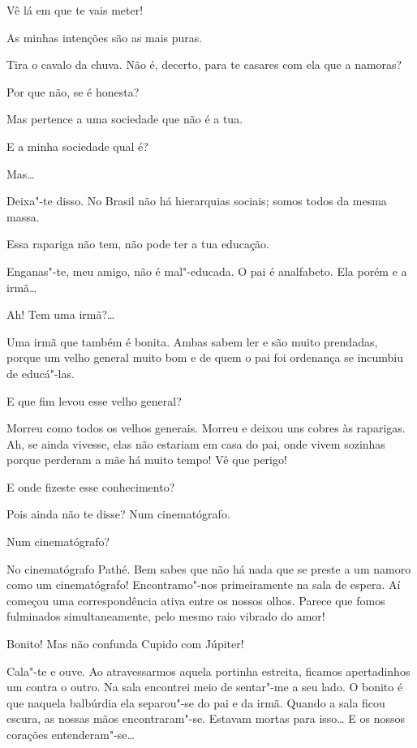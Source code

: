  Vê lá em que te vais meter!

 As minhas intenções são as mais puras.

 Tira o cavalo da chuva. Não é,
decerto, para te casares com ela que a namoras?

 Por que não, se é honesta?

 Mas pertence a uma sociedade que não é a tua.

 E a minha sociedade qual é?

 Mas\ldots

 Deixa"-te
disso. No Brasil não há hierarquias sociais; somos
todos da mesma massa.

 Essa rapariga não tem,
não pode ter a tua educação.

 Enganas"-te, meu
amigo, não é mal"-educada. O pai é analfabeto. Ela
porém e a irmã\ldots

 Ah! Tem uma irmã?\ldots

 Uma irmã
que também é bonita. Ambas sabem ler e são muito
prendadas, porque um velho general muito bom e de quem o pai
foi ordenança se incumbiu de educá"-las.

 E que fim levou
esse velho general?

 Morreu como todos
os velhos generais. Morreu e deixou uns cobres às
raparigas. Ah, se ainda vivesse, elas não estariam
em casa do pai, onde vivem sozinhas porque perderam a
mãe há muito tempo! Vê que perigo!

 E onde fizeste esse
conhecimento?

 Pois ainda
não te disse? Num cinematógrafo.

 Num cinematógrafo?

 No
cinematógrafo Pathé. Bem sabes que não há
nada que se preste a um namoro como um
cinematógrafo! Encontramo"-nos primeiramente na sala
de espera. Aí começou uma correspondência
ativa entre os nossos olhos. Parece que fomos fulminados
simultaneamente, pelo mesmo raio vibrado do amor!

 Bonito! Mas
não confunda Cupido com Júpiter!

 Cala"-te e ouve. Ao
atravessarmos aquela portinha estreita, ficamos apertadinhos um contra
o outro. Na sala encontrei meio de sentar"-me a seu lado. O bonito
é que naquela balbúrdia ela separou"-se do pai e da
irmã. Quando a sala ficou escura, as nossas
mãos encontraram"-se. Estavam mortas para isso\ldots{} E os
nossos corações entenderam"-se\ldots

